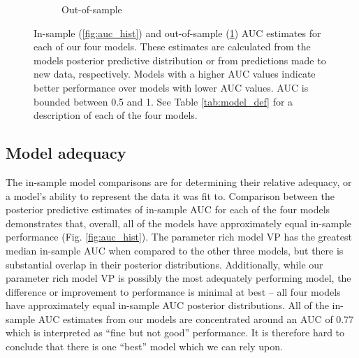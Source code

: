 \documentclass[12pt,letterpaper]{article}
\begin{document}
\begin{figure}[ht]
\begin{subfigure}[ht]{0.45\textwidth}
    \caption{Out-of-sample}
    \label{fig:fold_auc}
  \end{subfigure}
  \caption{In-sample (\ref{fig:auc_hist}) and out-of-sample (\ref{fig:fold_auc}) AUC estimates for each of our four models. These estimates are calculated from the models posterior predictive distribution or from predictions made to new data, respectively. Models with a higher AUC values indicate better performance over models with lower AUC values. AUC is bounded between 0.5 and 1. See Table \ref{tab:model_def} for a description of each of the four models.}
  \label{fig:auc_compare}
\end{figure}

\subsection{Model adequacy}

The in-sample model comparisons are for determining their relative adequacy, or a model's ability to represent the data it was fit to. Comparison between the posterior predictive estimates of in-sample AUC for each of the four models demonstrates that, overall, all of the models have approximately equal in-sample performance (Fig. \ref{fig:auc_hist}). The parameter rich model VP has the greatest median in-sample AUC when compared to the other three models, but there is substantial overlap in their posterior distributions. Additionally, while our parameter rich model VP is possibly the most adequately performing model, the difference or improvement to performance is minimal at best -- all four models have approximately equal in-sample AUC posterior distributions. All of the in-sample AUC estimates from our models are concentrated around an AUC of 0.77 which is interpreted as ``fine but not good'' performance. It is therefore hard to conclude that there is one ``best'' model which we can rely upon. 

\end{document}
